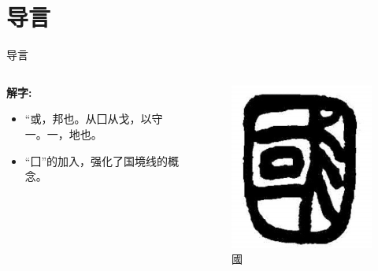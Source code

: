 \documentclass{beamer}
\begin{document}
\section{导言}
	\begin{frame}{导言}
		\begin{columns}
    		\begin{column}{0.5\textwidth} %
      		\textbf{解字:}
      		\begin{itemize}
        		\item “或，邦也。从囗从戈，以守一。一，地也。
        		\item “囗”的加入，强化了国境线的概念。
      		\end{itemize}
    		\end{column}
    		\begin{column}{0.5\textwidth} %
      		\begin{figure}
        		\includegraphics[width=0.7\linewidth]{fig/guofan.png} %
        		\caption{國}
      		\end{figure}
    		\end{column}
  		\end{columns}
	\end{frame}
\end{document}
